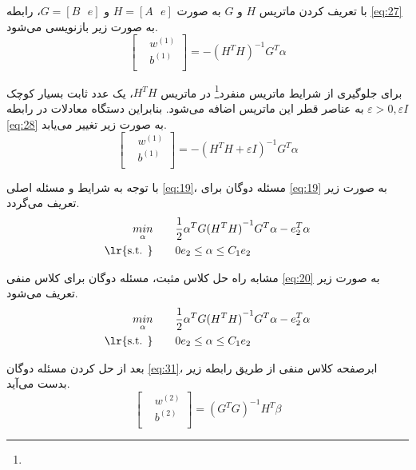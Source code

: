 با تعریف کردن ماتریس $H$ و $G$ به صورت $H=[A\text{ }e]$ و $G=[B\text{ }e]$، رابطه \ref{eq:27} به صورت زیر بازنویسی می‌شود.
\begin{equation}
\left[ \begin{aligned}
& {{w}^{(1)}} \\
& {{b}^{(1)}} \\
\end{aligned} \right]= -{{({{H}^{T}}H)}^{-1}}{{G}^{T}}\alpha
\label{eq:28}
\end{equation}

برای جلوگیری از شرایط ماتریس منفرد\footnote{}  در ماتریس $H^{T}H$، یک عدد ثابت بسیار کوچک  $\varepsilon > 0, \varepsilon I$ به عناصر قطر این ماتریس اضافه می‌شود. بنابراین دستگاه معادلات در رابطه \ref{eq:28} به صورت زیر تغییر می‌یابد.
\begin{equation}
\left[ \begin{aligned}
& {{w}^{(1)}} \\
& {{b}^{(1)}} \\
\end{aligned}\right]= -{{({{H}^{T}}H + \varepsilon I)}^{-1}}{{G}^{T}}\alpha
\label{eq:29}
\end{equation}

با توجه به شرایط  و مسئله اصلی \ref{eq:19}، مسئله دوگان برای \ref{eq:19} به صورت زیر تعریف می‌گردد.
\begin{equation}
\begin{split}
\mathop{{ min}}\limits_{\alpha} \qquad & \frac{1}{2}{{\alpha }^{T}}G{{({{H}^{T}}H)}^{-1}}{{G}^{T}}\alpha -e_{2}^{T}\alpha  \\
\textrm{\lr{s.t. }} \qquad & 0{{e}_{2}}\le \alpha \le {{C}_{1}}{{e}_{2}}
\end{split}
\label{eq:30}
\end{equation}

مشابه راه حل کلاس مثبت، مسئله دوگان برای کلاس منفی \ref{eq:20} به صورت زیر تعریف می‌شود.
\begin{equation}
\begin{split}
\mathop{{ min}}\limits_{\alpha} \qquad & \frac{1}{2}{{\alpha }^{T}}G{{({{H}^{T}}H)}^{-1}}{{G}^{T}}\alpha -e_{2}^{T}\alpha  \\
\textrm{\lr{s.t. }} \qquad & 0{{e}_{2}}\le \alpha \le {{C}_{1}}{{e}_{2}}
\end{split}
\label{eq:31}
\end{equation}

بعد از حل کردن مسئله دوگان \ref{eq:31}، ابرصفحه کلاس منفی از طریق رابطه زیر بدست می‌آید.
\begin{equation}
\left[ \begin{aligned}
& {{w}^{(2)}} \\
& {{b}^{(2)}} \\
\end{aligned}\right]= {{({{G}^{T}}G)}^{-1}}{{H}^{T}}\beta
\label{eq:32}
\end{equation}

